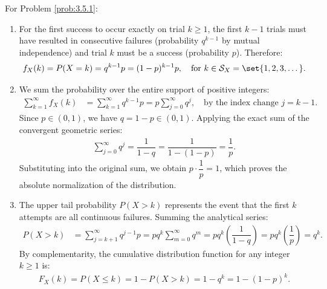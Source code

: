 \begin{solucion}
	\label{sol:3.5.1}
	For Problem \ref{prob:3.5.1}:
	\begin{enumerate}
		\item For the first success to occur exactly on trial $k \ge 1$, the first $k-1$ trials must have resulted in consecutive failures (probability $q^{k-1}$ by mutual independence) and trial $k$ must be a success (probability $p$). Therefore:
		\begin{align*}
			f_X(k) = P(X = k) = q^{k-1}p = (1-p)^{k-1}p, \quad \text{for } k \in \mathcal{S}_X = \set{1, 2, 3, \dots}.
		\end{align*}
		\item We sum the probability over the entire support of positive integers:
		\begin{align*}
			\sum_{k=1}^{\infty} f_X(k) &= \sum_{k=1}^{\infty} q^{k-1}p = p \sum_{j=0}^{\infty} q^j, \quad \text{by the index change } j = k-1.
		\end{align*}
		Since $p \in (0, 1)$, we have $q = 1-p \in (0, 1)$. Applying the exact sum of the convergent geometric series:
		\begin{align*}
			\sum_{j=0}^{\infty} q^j = \dfrac{1}{1 - q} = \dfrac{1}{1 - (1-p)} = \dfrac{1}{p}.
		\end{align*}
		Substituting into the original sum, we obtain $p \cdot \dfrac{1}{p} = 1$, which proves the absolute normalization of the distribution.
		\item The upper tail probability $P(X > k)$ represents the event that the first $k$ attempts are all continuous failures. Summing the analytical series:
		\begin{align*}
			P(X > k) &= \sum_{j=k+1}^{\infty} q^{j-1}p = p q^k \sum_{m=0}^{\infty} q^m = p q^k \left(\dfrac{1}{1-q}\right) = p q^k \left(\dfrac{1}{p}\right) = q^k.
		\end{align*}
		By complementarity, the cumulative distribution function for any integer $k \ge 1$ is:
		\begin{align*}
			F_X(k) = P(X \le k) = 1 - P(X > k) = 1 - q^k = 1 - (1-p)^k.
		\end{align*}
	\end{enumerate}
\end{solucion}

